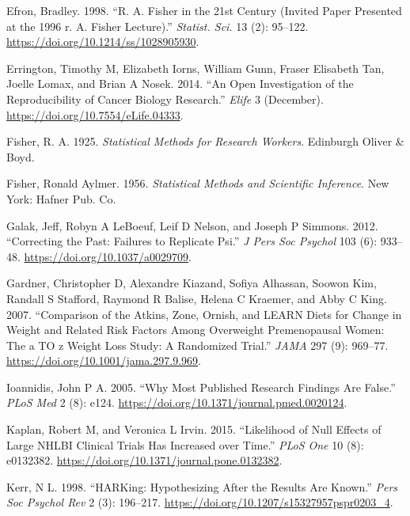 \documentclass[
  12pt,
]{book}
\newlength{\cslhangindent}
\newlength{\cslentryspacingunit} %
\newenvironment{CSLReferences}[2] %
 {%
  \setlength{\parindent}{0pt}
  \ifodd #1
  \let\oldpar\par
  \def\par{\hangindent=\cslhangindent\oldpar}
  \fi
  \setlength{\parskip}{#2\cslentryspacingunit}
 }%
 {}
\begin{document}
\begin{CSLReferences}{1}{0}
\leavevmode{}%
Efron, Bradley. 1998. {``R. A. Fisher in the 21st Century (Invited Paper Presented at the 1996 r. A. Fisher Lecture).''} \emph{Statist. Sci.} 13 (2): 95--122. \url{https://doi.org/10.1214/ss/1028905930}.

\leavevmode{}%
Errington, Timothy M, Elizabeth Iorns, William Gunn, Fraser Elisabeth Tan, Joelle Lomax, and Brian A Nosek. 2014. {``An Open Investigation of the Reproducibility of Cancer Biology Research.''} \emph{Elife} 3 (December). \url{https://doi.org/10.7554/eLife.04333}.

\leavevmode{}%
Fisher, R. A. 1925. \emph{Statistical Methods for Research Workers}. Edinburgh Oliver \& Boyd.

\leavevmode{}%
Fisher, Ronald Aylmer. 1956. \emph{Statistical Methods and Scientific Inference}. New York: Hafner Pub. Co.

\leavevmode{}%
Galak, Jeff, Robyn A LeBoeuf, Leif D Nelson, and Joseph P Simmons. 2012. {``Correcting the Past: Failures to Replicate Psi.''} \emph{J Pers Soc Psychol} 103 (6): 933--48. \url{https://doi.org/10.1037/a0029709}.

\leavevmode{}%
Gardner, Christopher D, Alexandre Kiazand, Sofiya Alhassan, Soowon Kim, Randall S Stafford, Raymond R Balise, Helena C Kraemer, and Abby C King. 2007. {``Comparison of the Atkins, Zone, Ornish, and LEARN Diets for Change in Weight and Related Risk Factors Among Overweight Premenopausal Women: The a TO z Weight Loss Study: A Randomized Trial.''} \emph{JAMA} 297 (9): 969--77. \url{https://doi.org/10.1001/jama.297.9.969}.

\leavevmode{}%
Ioannidis, John P A. 2005. {``Why Most Published Research Findings Are False.''} \emph{PLoS Med} 2 (8): e124. \url{https://doi.org/10.1371/journal.pmed.0020124}.

\leavevmode{}%
Kaplan, Robert M, and Veronica L Irvin. 2015. {``Likelihood of Null Effects of Large NHLBI Clinical Trials Has Increased over Time.''} \emph{PLoS One} 10 (8): e0132382. \url{https://doi.org/10.1371/journal.pone.0132382}.

\leavevmode{}%
Kerr, N L. 1998. {``HARKing: Hypothesizing After the Results Are Known.''} \emph{Pers Soc Psychol Rev} 2 (3): 196--217. \url{https://doi.org/10.1207/s15327957pspr0203_4}.


\end{CSLReferences}
\end{document}
